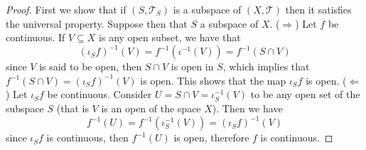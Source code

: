 \begin{proof}
  First we show that if \((S, \mathcal T_S)\) is a subspace of \((X, \mathcal{T})\) then
  it satisfies the universal property. Suppose then that \(S\) a subspace of
  \(X\). (\(\Rightarrow\)) Let \(f\) be continuous. If \(V \subseteq X\) is any open subset, we have
  that
  \[
    (\iota_S  f)^{-1}(V) = f^{-1}(\iota^{-1}(V)) = f^{-1}(S \cap V)
  \]
  since \(V\) is said to be open, then \(S \cap V\) is open in \(S\), which
  implies that \(f^{-1}(S \cap V) = (\iota_S  f)^{-1}(V)\) is open. This
  shows that the map \(\iota_S  f\) is open. (\(\Leftarrow\)) Let \(\iota_S
   f\) be continuous. Consider \(U = S \cap V = \iota_S^{-1}(V)\) to be any
  open set of the subspace \(S\) (that is \(V\) is an open of the space \(X\)).
  Then we have
  \[
    f^{-1}(U) = f^{-1}(\iota_S^{-1}(V)) = (\iota_S  f)^{-1}(V)
  \]
  since \(\iota_S  f\) is continuous, then \(f^{-1}(U)\) is open, therefore
  \(f\) is continuous.


\end{proof}
